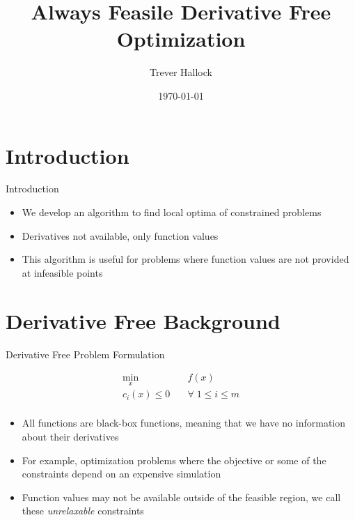 \documentclass{beamer}
\begin{document}
\title{Always Feasile Derivative Free Optimization}   
\author{Trever Hallock} 
\date{\today} 

\frame{\titlepage} 

\section{Introduction}

\begin{frame}{Introduction}
	\begin{itemize}
		\item We develop an algorithm to find local optima of constrained problems
		\item Derivatives not available, only function values
		\item This algorithm is useful for problems where function values are not provided at infeasible points
	\end{itemize}
\end{frame}

\section{Derivative Free Background}

\begin{frame}{Derivative Free Problem Formulation}
\begin{center}
\label{Problem}
\begin{align*}
\min_x & \quad f(x) \\
  c_i(x) \le 0   & \quad \forall \; 1 \le i \le m \\
\end{align*}
\end{center}
	\begin{itemize}
		\item All functions are black-box functions, meaning that we have no information about their derivatives
		\item For example, optimization problems where the objective or some of the constraints depend on an expensive simulation
		\item Function values may not be available outside of the feasible region, 
		we call these \emph{unrelaxable} constraints
	\end{itemize}
\end{frame}
\end{document}
